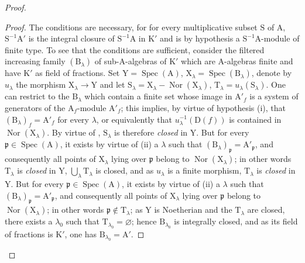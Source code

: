 \begin{proof}
\begin{proof}
The conditions are necessary, for for every multiplicative subset $\mathrm{S}$ of $\mathrm{A}$,
$\mathrm{S}^{-1}\mathrm{A}'$ is the integral closure of $\mathrm{S}^{-1}\mathrm{A}$ in $\mathrm{K}'$ and is by hypothesis a $\mathrm{S}^{-1}\mathrm{A}$-module
of finite type. To see that the conditions are sufficient, consider the filtered increasing
family $(\mathrm{B}_\lambda)$ of sub-$\mathrm{A}$-algebras of $\mathrm{K}'$ which are $\mathrm{A}$-algebras finite and have $\mathrm{K}'$ as
field of fractions. Set $\mathrm{Y}=\operatorname{Spec}(\mathrm{A})$, $\mathrm{X}_\lambda=\operatorname{Spec}(\mathrm{B}_\lambda)$, denote by $u_\lambda$ the
morphism $\mathrm{X}_\lambda\to\mathrm{Y}$ and let $\mathrm{S}_\lambda=\mathrm{X}_\lambda-\operatorname{Nor}(\mathrm{X}_\lambda)$, $\mathrm{T}_\lambda=u_\lambda(\mathrm{S}_\lambda)$. One can restrict to the $\mathrm{B}_\lambda$
which contain a finite set whose image in $\mathrm{A}'_f$ is a system of generators of the
$\mathrm{A}_f$-module $\mathrm{A}'_f$; this implies, by virtue of hypothesis (i), that $(\mathrm{B}_\lambda)_f=\mathrm{A}'_f$ for every $\lambda$,
or equivalently that $u_\lambda^{-1}(\mathrm{D}(f))$ is contained in $\operatorname{Nor}(\mathrm{X}_\lambda)$. By virtue of , $\mathrm{S}_\lambda$ is therefore
\emph{closed} in $\mathrm{Y}$. But for every
$\mathfrak{p}\in\operatorname{Spec}(\mathrm{A})$, it exists by virtue of (ii) a $\lambda$ such that $(\mathrm{B}_\lambda)_\mathfrak{p}=\mathrm{A}'_\mathfrak{p}$, and consequently all points
of $\mathrm{X}_\lambda$ lying over $\mathfrak{p}$ belong to $\operatorname{Nor}(\mathrm{X}_\lambda)$; in other words $\mathrm{T}_\lambda$ is \emph{closed} in $\mathrm{Y}$, $\bigcup_\lambda\mathrm{T}_\lambda$ is closed, and as
$u_\lambda$ is a finite morphism, $\mathrm{T}_\lambda$ is \emph{closed} in $\mathrm{Y}$. But for every
$\mathfrak{p}\in\operatorname{Spec}(\mathrm{A})$, it exists by virtue of (ii) a $\lambda$ such that $(\mathrm{B}_\lambda)_\mathfrak{p}=\mathrm{A}'_\mathfrak{p}$, and consequently all points
of $\mathrm{X}_\lambda$ lying over $\mathfrak{p}$ belong to $\operatorname{Nor}(\mathrm{X}_\lambda)$; in other words $\mathfrak{p}\notin\mathrm{T}_\lambda$; as
$\mathrm{Y}$ is Noetherian and the $\mathrm{T}_\lambda$ are closed, there exists a $\lambda_0$ such that $\mathrm{T}_{\lambda_0}=\varnothing$; hence $\mathrm{B}_{\lambda_0}$
is integrally closed, and as its field of fractions is $\mathrm{K}'$, one has $\mathrm{B}_{\lambda_0}=\mathrm{A}'$.
\end{proof}


\end{proof}
